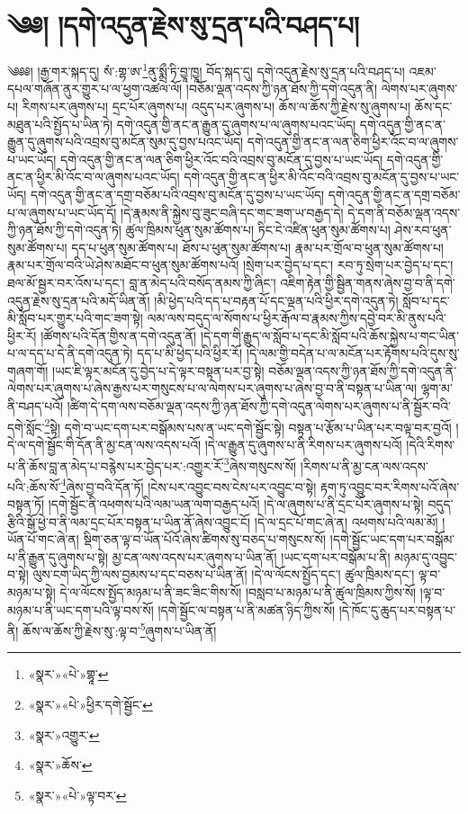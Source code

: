 \chapter{༄༅། །དགེ་འདུན་རྗེས་སུ་དྲན་པའི་བཤད་པ།}༄༅༅། །རྒྱ་གར་སྐད་དུ། སཾ་:གྷ་ཨ་\footnote{«སྣར་»«པེ་»གྷཱ་}ནུ་སྨྲྀ་ཏི་བྱཱ་ཁྱཱ། བོད་སྐད་དུ། དགེ་འདུན་རྗེས་སུ་དྲན་པའི་བཤད་པ། འཇམ་དཔལ་གཞོན་ནུར་གྱུར་པ་ལ་ཕྱག་འཚལ་ལོ། །བཅོམ་ལྡན་འདས་ཀྱི་ཉན་ཐོས་ཀྱི་དགེ་འདུན་ནི། ལེགས་པར་ཞུགས་པ། རིགས་པར་ཞུགས་པ། དྲང་པོར་ཞུགས་པ། འདུད་པར་ཞུགས་པ། ཆོས་ལ་ཆོས་ཀྱི་རྗེས་སུ་ཞུགས་པ། ཆོས་དང་མཐུན་པའི་སྤྱོད་པ་ཡིན་ཏེ། དགེ་འདུན་གྱི་ནང་ན་རྒྱུན་དུ་ཞུགས་པ་ལ་ཞུགས་པའང་ཡོད། དགེ་འདུན་གྱི་ནང་ན་རྒྱུན་དུ་ཞུགས་པའི་འབྲས་བུ་མངོན་སུམ་དུ་བྱས་པའང་ཡོད། དགེ་འདུན་གྱི་ནང་ན་ལན་ཅིག་ཕྱིར་འོང་བ་ལ་ཞུགས་པ་ཡང་ཡོད། དགེ་འདུན་གྱི་ནང་ན་ལན་ཅིག་ཕྱིར་འོང་བའི་འབྲས་བུ་མངོན་དུ་བྱས་པ་ཡང་ཡོད། དགེ་འདུན་གྱི་ནང་ན་ཕྱིར་མི་འོང་བ་ལ་ཞུགས་པའང་ཡོད། དགེ་འདུན་གྱི་ནང་ན་ཕྱིར་མི་འོང་བའི་འབྲས་བུ་མངོན་དུ་བྱས་པ་ཡང་ཡོད། དགེ་འདུན་གྱི་ནང་ན་དགྲ་བཅོམ་པའི་འབྲས་བུ་མངོན་དུ་བྱས་པ་ཡང་ཡོད། དགེ་འདུན་གྱི་ནང་ན་དགྲ་བཅོམ་པ་ལ་ཞུགས་པ་ཡང་ཡོད་དོ། །དེ་རྣམས་ནི་སྐྱེས་བུ་ཟུང་བཞི་དང་གང་ཟག་ཡ་བརྒྱད་དེ། དེ་དག་ནི་བཅོམ་ལྡན་འདས་ཀྱི་ཉན་ཐོས་ཀྱི་དགེ་འདུན་ཏེ། ཚུལ་ཁྲིམས་ཕུན་སུམ་ཚོགས་པ། ཏིང་ངེ་འཛིན་ཕུན་སུམ་ཚོགས་པ། ཤེས་རབ་ཕུན་སུམ་ཚོགས་པ། དད་པ་ཕུན་སུམ་ཚོགས་པ། ཐོས་པ་ཕུན་སུམ་ཚོགས་པ། རྣམ་པར་གྲོལ་བ་ཕུན་སུམ་ཚོགས་པ། རྣམ་པར་གྲོལ་བའི་ཡེ་ཤེས་མཐོང་བ་ཕུན་སུམ་ཚོགས་པའོ། །སྲེག་པར་བྱེད་པ་དང་། རབ་ཏུ་སྲེག་པར་བྱེད་པ་དང་། ཐལ་མོ་སྦྱར་བར་འོས་པ་དང་། བླ་ན་མེད་པའི་བསོད་ནམས་ཀྱི་ཞིང་། འཇིག་རྟེན་གྱི་སྦྱིན་གནས་ཞེས་བྱ་བ་ནི་དགེ་འདུན་རྗེས་སུ་དྲན་པའི་མདོ་ཡིན་ནོ། །མི་ཕྱེད་པའི་དད་པ་བརྟན་པོ་དང་ལྡན་པའི་ཕྱིར་དགེ་འདུན་ཏེ། སློབ་པ་དང་མི་སློབ་པར་གྱུར་པའི་གང་ཟག་སྟེ། ལམ་ལས་བདུད་ལ་སོགས་པ་ཕྱིར་རྒོལ་བ་རྣམས་ཀྱིས་དབྱེ་བར་མི་ནུས་པའི་ཕྱིར་རོ། །ཚོགས་པའི་དོན་གྱིས་ན་དགེ་འདུན་ནོ། །དེ་དག་གི་རྒྱུད་ལ་སློབ་པ་དང་མི་སློབ་པའི་ཆོས་སྐྱེས་པ་གང་ཡིན་པ་ལ་དད་པ་དེ་ནི་དགེ་འདུན་ཏེ། དད་པ་མི་ཕྱེད་པའི་ཕྱིར་རོ། །དེ་ལམ་གྱི་བདེན་པ་ལ་མངོན་པར་རྟོགས་པའི་དུས་སུ་གཞག་གོ། །ཡང་ཇི་ལྟར་མངོན་དུ་བྱེད་པ་དེ་ལྟར་བསྟན་པར་བྱ་སྟེ། བཅོམ་ལྡན་འདས་ཀྱི་ཉན་ཐོས་ཀྱི་དགེ་འདུན་ནི་ལེགས་པར་ཞུགས་པ་ཞེས་རྒྱས་པར་གསུངས་པ་ལ་ལེགས་པར་ཞུགས་པ་ཞེས་བྱ་བ་ནི་བསྟན་པ་ཡིན་ལ། ལྷག་མ་ནི་བཤད་པའོ། །ཚིག་དེ་དག་ལས་བཅོམ་ལྡན་འདས་ཀྱི་ཉན་ཐོས་ཀྱི་དགེ་འདུན་ལེགས་པར་ཞུགས་པ་ནི་སྦྱོར་བའི་དགེ་སློང་\footnote{«སྣར་»«པེ་»ཕྱིར་དགེ་སྦྱོང་}སྟེ། དགེ་བ་ཡང་དག་པར་བསྒོམས་པས་ན་ཡང་དགེ་སྦྱོང་སྟེ། བསྟན་པ་རྩོམ་པ་ཡིན་པར་བལྟ་བར་བྱའོ། །དེ་ལ་དགེ་སྦྱོང་གི་དོན་ནི་མྱ་ངན་ལས་འདས་པའོ། །དེ་ལ་རྒྱུན་དུ་ཞུགས་པ་ནི་རིགས་པར་ཞུགས་པའོ། །དེའི་རིགས་པ་ནི་ཆོས་བླ་ན་མེད་པ་བརྙེས་པར་བྱེད་པར་:འགྱུར་རོ་\footnote{«སྣར་»འགྱུར་}ཞེས་གསུངས་སོ། །རིགས་པ་ནི་མྱ་ངན་ལས་འདས་པའི་:ཆོས་སོ་\footnote{«སྣར་»ཆོས་}ཞེས་བྱ་བའི་དོན་ཏོ། །ངེས་པར་འབྱུང་བས་ངེས་པར་འབྱུང་བ་སྟེ། རྟག་ཏུ་འབྱུང་བར་རིགས་པའོ་ཞེས་བསྟན་ཏོ། །དགེ་སྦྱོང་ནི་འཕགས་པའི་ལམ་ཡན་ལག་བརྒྱད་པའོ། །དེ་ལ་ཞུགས་པ་ནི་དྲང་པོར་ཞུགས་པ་སྟེ། བདུད་རྩིའི་སྒོ་ཕྱེ་བ་ནི་ལམ་དྲང་པོར་བསྟན་པ་ཡིན་ནོ་ཞེས་འབྱུང་ངོ། །དེ་ལ་དྲང་པོ་གང་ཞེ་ན། འཕགས་པའི་ལམ་མོ། །ཡོན་པོ་གང་ཞེ་ན། སྡིག་ཅན་ལྟ་བ་ཡོན་པོའོ་ཞེས་ཚིགས་སུ་བཅད་པ་གསུངས་སོ། །དགེ་སྦྱོང་ཡང་དག་པར་བསྒོམ་པ་ནི་རྒྱུན་དུ་ཞུགས་པ་སྟེ། མྱ་ངན་ལས་འདས་པར་ཞུགས་པ་ཡིན་ནོ། །ཡང་དག་པར་བསྒོམ་པ་ནི། མཉམ་དུ་འབྱུང་བ་སྟེ། ལུས་ངག་ཡིད་ཀྱི་ལས་བྱམས་པ་དང་བཅས་པ་ཡིན་ནོ། །དེ་ལ་ལོངས་སྤྱོད་དང་། ཚུལ་ཁྲིམས་དང་། ལྟ་བ་མཉམ་པ་སྟེ། དེ་ལ་ལོངས་སྤྱོད་མཉམ་པ་ནི་ཟང་ཟིང་གིས་སོ། །བསླབ་པ་མཉམ་པ་ནི་ཚུལ་ཁྲིམས་ཀྱིས་སོ། །ལྟ་བ་མཉམ་པ་ནི་ཡང་དག་པའི་ལྟ་བས་སོ། །དགེ་སྦྱོང་ལ་བསྟན་པ་ནི་མཚན་ཉིད་ཀྱིས་སོ། །དེ་ཁོང་དུ་ཆུད་པར་བསྟན་པ་ནི། ཆོས་ལ་ཆོས་ཀྱི་རྗེས་སུ་:ལྟ་བ་\footnote{«སྣར་»«པེ་»ལྟ་བར་}ཞུགས་པ་ཡིན་ནོ། 